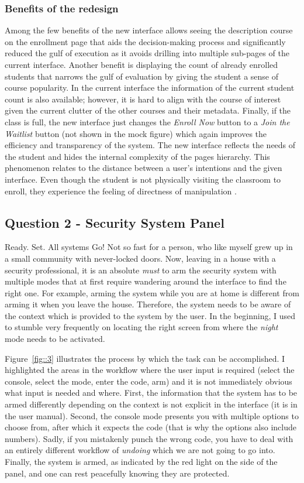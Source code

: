 \documentclass[12pt,letterpaper]{article}
\begin{document}
\subsubsection*{Benefits of the redesign}
Among the few benefits of the new interface allows seeing the description course on the enrollment page that aids the decision-making process and significantly reduced the gulf of execution as it avoids drilling into multiple sub-pages of the current interface. Another benefit is displaying the count of already enrolled students that narrows the gulf of evaluation by giving the student a sense of course popularity. In the current interface the information of the current student count is also available; however, it is hard to align with the course of interest given the current clutter of the other courses and their metadata. Finally, if the class is full, the new interface just changes the \textit{Enroll Now} button to a \textit{Join the Waitlist} button (not shown in the mock figure) which again improves the efficiency and transparency of the system. The new interface reflects the needs of the student and hides the internal complexity of the pages hierarchy. This phenomenon relates to the distance between a user's intentions and the given interface. Even though the student is not physically visiting the classroom to enroll, they experience the feeling of directness of manipulation \cite{hutchins1985direct}. 

\subsection*{Question 2 - Security System Panel}
Ready. Set. All systems Go! Not so fast for a person, who like myself grew up in a small community with never-locked doors. Now, leaving in a house with a security professional, it is an absolute \textit{must} to arm the security system with multiple modes that at first require wandering around the interface to find the right one. For example, arming the system while you are at home is different from arming it when you leave the house. Therefore, the system needs to be aware of the context which is provided to the system by the user. In the beginning, I used to stumble very frequently on locating the right screen from where the \textit{night} mode needs to be activated. 

Figure~\ref{fig::3} illustrates the process by which the task can be accomplished. I highlighted the areas in the workflow where the user input is required (select the console, select the mode, enter the code, arm) and it is not immediately obvious what input is needed and where. First, the information that the system has to be armed differently depending on the context is not explicit in the interface (it is in the user manual). Second, the console mode presents you with multiple options to choose from, after which it expects the code (that is why the options also include numbers). Sadly, if you mistakenly punch the wrong code, you have to deal with an entirely different workflow of \textit{undoing} which we are not going to go into. Finally, the system is armed, as indicated by the red light on the side of the panel, and one can rest peacefully knowing they are protected.  
\end{document}
